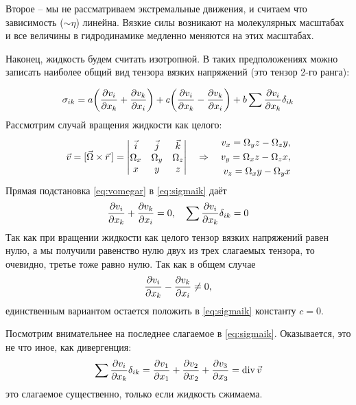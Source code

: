 Второе -- мы не рассматриваем экстремальные движения, и считаем что зависимость ($\sim \eta$) линейна. Вязкие силы возникают на молекулярных масштабах и все величины в гидродинамике медленно меняются на этих масштабах.

Наконец, жидкость будем считать изотропной. В таких предположениях можно записать наиболее общий вид тензора вязких напряжений (это тензор 2-го ранга):
{\color{red}
\begin{equation}
	\label{eq:sigmaik}
    \sigma_{ik} = a\qty(
        \pdv{v_i}{x_k}+\pdv{v_k}{x_i}
    )+
    c\qty(
       \pdv{v_i}{x_k}-\pdv{v_k}{x_i}
    )+
    b\sum \pdv{v_i}{x_k} \delta_{ik}
\end{equation}
Рассмотрим случай вращения жидкости как целого:
\begin{equation}
	\label{eq:vomegar}
    \vec{v} = [\vec{\Omega}\times \vec{r}\,]  =
    \mqty|
    \vec{i} & \vec{j} & \vec{k}\\
    \Omega_x & \Omega_y & \Omega_z\\
    x& y & z
    | \quad \Rightarrow \quad
    \begin{aligned}
    	v_x = \Omega_y z - \Omega_z y,\\
    	v_y = \Omega_x z - \Omega_z x, \\
    	v_z = \Omega_x y - \Omega_y x
    \end{aligned}
\end{equation}
Прямая подстановка \eqref{eq:vomegar} в \eqref{eq:sigmaik} даёт
\begin{equation}
    \pdv{v_i}{x_k}+\pdv{v_k}{x_i} = 0, \quad
    \sum \pdv{v_i}{x_k} \delta_{ik} = 0
\end{equation}
Так как при вращении жидкости как 	целого тензор вязких напряжений равен нулю, а мы получили равенство нулю двух из трех слагаемых тензора, то очевидно, третье тоже равно нулю.
Так как в общем случае
\begin{equation}
    \pdv{v_i}{x_k}-\pdv{v_k}{x_i} \ne 0,
\end{equation}
единственным вариантом остается положить в \eqref{eq:sigmaik} константу $c=0$.

Посмотрим внимательнее на последнее слагаемое в \eqref{eq:sigmaik}. Оказывается, это не что иное, как дивергенция:
\begin{equation}
    \sum \pdv{v_i}{x_k} \delta_{ik} = 
    \pdv{v_1}{x_1}+\pdv{v_2}{x_2}+\pdv{v_3}{x_3} = \operatorname{div} \vec{v}
\end{equation}
это слагаемое существенно, только если жидкость сжимаема.

}
